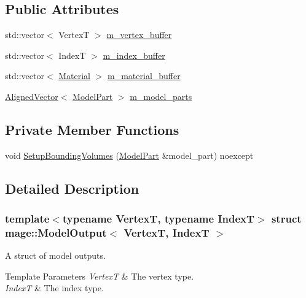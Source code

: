 \subsection*{Public Attributes}
\begin{DoxyCompactItemize}
\item 
std\+::vector$<$ VertexT $>$ \hyperlink{structmage_1_1_model_output_a93a22503c41a2c4a0f81f25d1d5317dd}{m\+\_\+vertex\+\_\+buffer}
\item 
std\+::vector$<$ IndexT $>$ \hyperlink{structmage_1_1_model_output_accf4483b85b26525e180e6ffd3678fc6}{m\+\_\+index\+\_\+buffer}
\item 
std\+::vector$<$ \hyperlink{classmage_1_1_material}{Material} $>$ \hyperlink{structmage_1_1_model_output_a82e2a73de1adde3b4360f290078d0c7d}{m\+\_\+material\+\_\+buffer}
\item 
\hyperlink{namespacemage_a8664bfb5ce2179fc64eae9f82c8a5ba8}{Aligned\+Vector}$<$ \hyperlink{structmage_1_1_model_part}{Model\+Part} $>$ \hyperlink{structmage_1_1_model_output_aca7e45b0a0315459fd11b45face48544}{m\+\_\+model\+\_\+parts}
\end{DoxyCompactItemize}
\subsection*{Private Member Functions}
\begin{DoxyCompactItemize}
\item 
void \hyperlink{structmage_1_1_model_output_acecfa6de92e27b435ef15cc02640e992}{Setup\+Bounding\+Volumes} (\hyperlink{structmage_1_1_model_part}{Model\+Part} \&model\+\_\+part) noexcept
\end{DoxyCompactItemize}


\subsection{Detailed Description}
\subsubsection*{template$<$typename VertexT, typename IndexT$>$\newline
struct mage\+::\+Model\+Output$<$ Vertex\+T, Index\+T $>$}

A struct of model outputs.


\begin{DoxyTemplParams}{Template Parameters}
{\em VertexT} & The vertex type. \\
\hline
{\em IndexT} & The index type. \\
\hline
\end{DoxyTemplParams}


